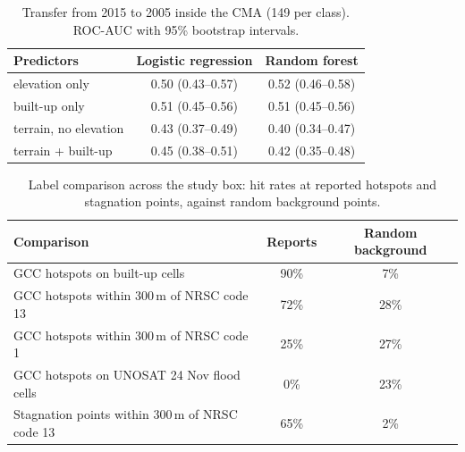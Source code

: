 \begin{table}[h]
\centering
\caption{Transfer from 2015 to 2005 inside the CMA (149 per class). ROC-AUC with 95\% bootstrap intervals.}
\label{tab:transfer}
\begin{tabular}{lcc}
\toprule
Predictors & Logistic regression & Random forest \\
\midrule
elevation only & 0.50 (0.43--0.57) & 0.52 (0.46--0.58) \\
built-up only & 0.51 (0.45--0.56) & 0.51 (0.45--0.56) \\
terrain, no elevation & 0.43 (0.37--0.49) & 0.40 (0.34--0.47) \\
terrain + built-up & 0.45 (0.38--0.51) & 0.42 (0.35--0.48) \\
\bottomrule
\end{tabular}
\end{table}

\begin{table}[h]
\centering
\caption{Label comparison across the study box: hit rates at reported hotspots and stagnation points, against random background points.}
\label{tab:labels}
\begin{tabular}{lcc}
\toprule
Comparison & Reports & Random background \\
\midrule
GCC hotspots on built-up cells & 90\% & 7\% \\
GCC hotspots within 300\,m of NRSC code 13 & 72\% & 28\% \\
GCC hotspots within 300\,m of NRSC code 1 & 25\% & 27\% \\
GCC hotspots on UNOSAT 24 Nov flood cells & 0\% & 23\% \\
Stagnation points within 300\,m of NRSC code 13 & 65\% & 2\% \\
\bottomrule
\end{tabular}
\end{table}
